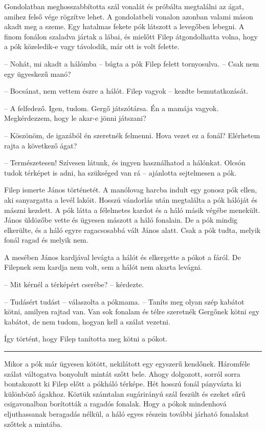 \documentclass[10pt]{memoir}
\renewcommand{\pfbreakdisplay}{\bigskip \ding{166} \bigskip}
\newcommand{\secbreak}{\fancybreak{\pfbreakdisplay}\indent}
\begin{document}
Gondolatban meghosszabbította szál vonalát és próbálta megtalálni az ágat,
amihez felső vége rögzítve lehet. A gondolatbeli vonalon azonban valami máson
akadt meg a szeme. Egy hatalmas fekete pók látszott a levegőben lebegni. A
finom fonálon szaladva jártak a lábai, és mielőtt Filep átgondolhatta volna,
hogy a pók közeledik-e vagy távolodik, már ott is volt felette.

-- Nohát, mi akadt a hálómba -- búgta a pók Filep felett tornyosulva. --
Csak nem egy ügyeskezű manó?

-- Bocsánat, nem vettem észre a hálót. Filep vagyok -- kezdte bemutatkozását.

-- A felfedező. Igen, tudom. Gergő játszótársa. Én a mamája vagyok.
Megkérdezzem, hogy le akar-e jönni játszani?

-- Köszönöm, de igazából én szeretnék felmenni. Hova vezet ez a fonál?
Elérhetem rajta a következő ágat?

-- Természetesen! Szívesen látunk, és ingyen használhatod a hálónkat. Olcsón
tudok térképet is adni, ha szükséged van rá -- ajánlotta sejtelmesen a pók.

Filep ismerte János történetét. A manólovag harcba indult egy gonosz pók ellen,
aki sanyargatta a levél lakóit. Hosszú vándorlás után megtalálta a pók hálóját
és mászni kezdett. A pók látta a félelmetes kardot és a háló másik végébe
menekült. János üldözőbe vette és ügyesen mászott a háló fonalain. De a pók
mindig elkerülte, és a háló egyre ragacsosabbá vált János alatt. Csak a pók
tudta, melyik fonál ragad és melyik nem.

A mesében János kardjával levágta a hálót és elkergette a pókot a fáról. De
Filepnek sem kardja nem volt, sem a hálót nem akarta levágni.

-- Mit kérnél a térképért cserébe? -- kérdezte.

-- Tudásért tudást -- válaszolta a pókmama. -- Taníts meg olyan szép kabátot
kötni, amilyen rajtad van. Van sok fonalam és télre szeretnék Gergőnek kötni
egy kabátot, de nem tudom, hogyan kell a szálat vezetni.

Így történt, hogy Filep tanította meg kötni a pókot.

\secbreak

Mikor a pók már ügyesen kötött, nekilátott egy egyszerű kendőnek. Háromféle
szálat váltogatva bonyolult mintát szőtt bele. Ahogy dolgozott, sorról sorra
bontakozott ki Filep előtt a pókháló térképe. Hét hosszú fonál pányvázta ki
különböző ágakhoz. Köztük számtalan sugárirányú szál feszült és ezeket sűrű
csigavonalban borították a ragadós fonalak. Hogy a pókok mindenhová
eljuthassanak beragadás nélkül, a háló egyes részein további járható fonalakat
szőttek a mintába.
\end{document}
